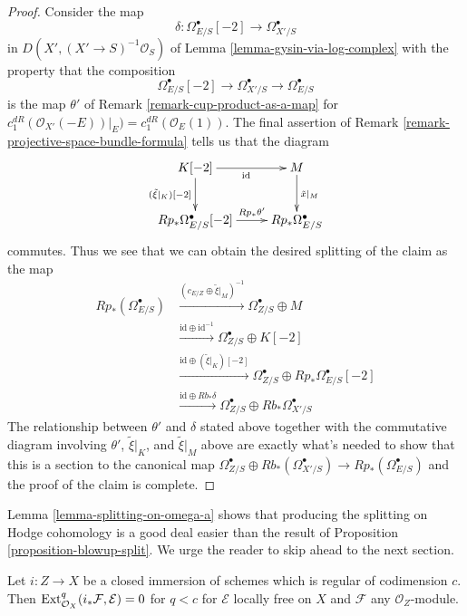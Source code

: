 \begin{proof}
\medskip\noindent
Consider the map
$$
\delta : \Omega^\bullet_{E/S}[-2] \longrightarrow \Omega^\bullet_{X'/S}
$$
in $D(X', (X' \to S)^{-1}\mathcal{O}_S)$ of
Lemma \ref{lemma-gysin-via-log-complex}
with the property that the composition
$$
\Omega^\bullet_{E/S}[-2] \longrightarrow \Omega^\bullet_{X'/S}
\longrightarrow
\Omega^\bullet_{E/S}
$$
is the map $\theta'$ of Remark \ref{remark-cup-product-as-a-map} for
$c_1^{dR}(\mathcal{O}_{X'}(-E))|_E) = c_1^{dR}(\mathcal{O}_E(1))$.
The final assertion of Remark \ref{remark-projective-space-bundle-formula}
tells us that the diagram
$$
\xymatrix{
K[-2] \ar[d]_{(\tilde \xi|_K)[-2]} \ar[r]_{\text{id}} &
M \ar[d]^{\tilde x|_M} \\
Rp_*\Omega^\bullet_{E/S}[-2] \ar[r]^-{Rp_*\theta'} &
Rp_*\Omega^\bullet_{E/S}
}
$$
commutes. Thus we see that we can obtain the desired splitting of
the claim as the map
\begin{align*}
Rp_*(\Omega^\bullet_{E/S})
& \xrightarrow{(c_{E/Z} \oplus \tilde \xi|_M)^{-1}}
\Omega^\bullet_{Z/S} \oplus M \\
& \xrightarrow{\text{id} \oplus \text{id}^{-1}}
\Omega^\bullet_{Z/S} \oplus K[-2] \\
& \xrightarrow{\text{id} \oplus (\tilde \xi|_K)[-2]}
\Omega^\bullet_{Z/S} \oplus Rp_*\Omega^\bullet_{E/S}[-2] \\
& \xrightarrow{\text{id} \oplus Rb_*\delta}
\Omega^\bullet_{Z/S} \oplus Rb_*\Omega^\bullet_{X'/S}
\end{align*}
The relationship between $\theta'$ and $\delta$ stated above
together with the commutative diagram involving $\theta'$, $\tilde \xi|_K$,
and $\tilde \xi|_M$ above are exactly what's needed to
show that this is a section to the canonical map
$\Omega^\bullet_{Z/S} \oplus Rb_*(\Omega^\bullet_{X'/S}) \to
Rp_*(\Omega^\bullet_{E/S})$ and the proof of the claim is complete.
\end{proof}

\noindent
Lemma \ref{lemma-splitting-on-omega-a}
shows that producing the splitting on Hodge
cohomology is a good deal easier than the result of
Proposition \ref{proposition-blowup-split}.
We urge the reader to skip ahead to the next section.

\begin{lemma}
\label{lemma-ext-zero}
Let $i : Z \to X$ be a closed immersion of schemes which is regular of
codimension $c$. Then $\mathop{\mathrm{Ext}}\nolimits^q_{\mathcal{O}_X}(i_*\mathcal{F}, \mathcal{E}) = 0$
for $q < c$ for $\mathcal{E}$ locally free on $X$ and $\mathcal{F}$
any $\mathcal{O}_Z$-module.
\end{lemma}

